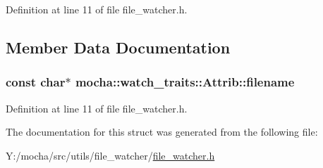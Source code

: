 Definition at line 11 of file file\_\-watcher.h.



\subsection{Member Data Documentation}
\hypertarget{structmocha_1_1watch__traits_1_1_attrib_aceb8b446ede477da0b6f416992d92066}{
\subsubsection[{filename}]{\setlength{\rightskip}{0pt plus 5cm}const char$\ast$ {\bf mocha::watch\_\-traits::Attrib::filename}}}
\label{structmocha_1_1watch__traits_1_1_attrib_aceb8b446ede477da0b6f416992d92066}


Definition at line 11 of file file\_\-watcher.h.



The documentation for this struct was generated from the following file:\begin{DoxyCompactItemize}
\item 
Y:/mocha/src/utils/file\_\-watcher/\hyperlink{file__watcher_8h}{file\_\-watcher.h}\end{DoxyCompactItemize}

